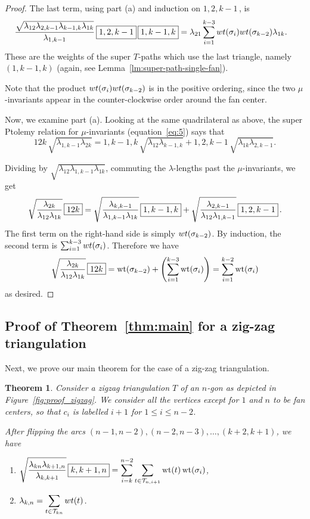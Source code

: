 \documentclass[11pt]{article}
\numberwithin{equation}{section}
\numberwithin{equation}{section}
\newtheorem{Theorem}{Theorem}[section]
\DeclareMathOperator{\wt}{wt}
\renewcommand{\l}[2]{\lambda_{#1#2}}
\begin{document}
\begin{proof}
 The last term, using part (a) and induction on $\boxed{1,2,k-1}$\,, is
 \begin{align*}
 \frac{\sqrt{\lambda_{12}\lambda_{2,k-1}\lambda_{k-1,k}\lambda_{1k}}}{\lambda_{1,k-1}} \, \boxed{1,2,k-1} \, \boxed{1,k-1,k}
 &= \lambda_{21} \sum_{i=1}^{k-3} {\rm wt}(\sigma_i) {\rm wt}(\sigma_{k-2}) \lambda_{1k}.
 \end{align*}
 These are the weights of the super $T$-paths which use the last triangle, namely $(1,k-1,k)$ (again, see Lemma~\ref{lm:super-path-single-fan}).

 Note that the product ${\rm wt}(\sigma_i) {\rm wt}(\sigma_{k-2})$ is in the positive ordering,
 since the two $\mu$-invariants appear in the counter-clockwise order around the fan center.

 Now, we examine part (a). Looking at the same quadrilateral as above, the super Ptolemy relation for $\mu$-invariants (equation~\eqref{eq:5}) says that
 \[ \boxed{12k} \, \sqrt{\lambda_{1,k-1}\lambda_{2k}} = \boxed{1,k-1,k} \, \sqrt{\lambda_{12}\lambda_{k-1,k}} + \boxed{1,2,k-1} \, \sqrt{\lambda_{1k}\lambda_{2,k-1}}. \]

 Dividing by $\sqrt{\l12\lambda_{1,k-1}\l1k}$, commuting the $\lambda$-lengths past the $\mu$-invariants, we get
 \[\sqrt{\l2k\over \l12\l1k }\, \boxed{12k}=\sqrt{\l k{,k-1} \over \l1{,k-1}\l1k }\,\boxed{1,k-1,k} + \sqrt{\l2{,k-1} \over\l12\l1{,k-1}}\,\boxed{1,2,k-1}\,.\]
 The first term on the right-hand side is simply ${\rm wt}(\sigma_{k-2})$. By induction, the second term is $\sum_{i=1}^{k-3} {\rm wt}(\sigma_i)$. Therefore we have
 \[\sqrt{\l2k\over \l12\l1k }\, \boxed{12k}=\wt(\sigma_{k-2}) + \left(\sum_{i=1}^{k-3}\wt(\sigma_i)\right)=\sum_{i=1}^{k-2}\wt(\sigma_{i})\]
 as desired.
\end{proof}

\subsection{Proof of Theorem~\ref{thm:main} for a zig-zag triangulation}

Next, we prove our main theorem for the case of a zig-zag triangulation.

\begin{Theorem} \label{thm:proof_zigzag}
 Consider a zigzag triangulation $T$ of an $n$-gon as depicted in Figure~{\rm \ref{fig:proof_zigzag}}. We consider all the vertices
 except for $1$ and $n$ to be fan centers, so that $c_{i}$ is labelled $i+1$ for $1\leq i\leq n-2$.

 After flipping the arcs $(n-1,n-2),(n-2,n-3),\dots,(k+2,k+1)$, we have
 \begin{enumerate}\itemsep=0pt
 \item[$(a)$] $\displaystyle \sqrt{\lambda_{kn}\lambda_{k+1,n}\over\lambda_{k,k+1}} \, \boxed{k,k+1,n} = \sum_{i=k}^{n-2} \sum_{t\in\mathcal T_{n,i+1}} \wt(t) \wt(\sigma_i)$,
 \item[$(b)$] $\displaystyle \lambda_{k,n} = \sum_{t \in \mathcal{T}_{kn}} {\rm wt}(t)$.
 \end{enumerate}
\end{Theorem}
\end{document}
